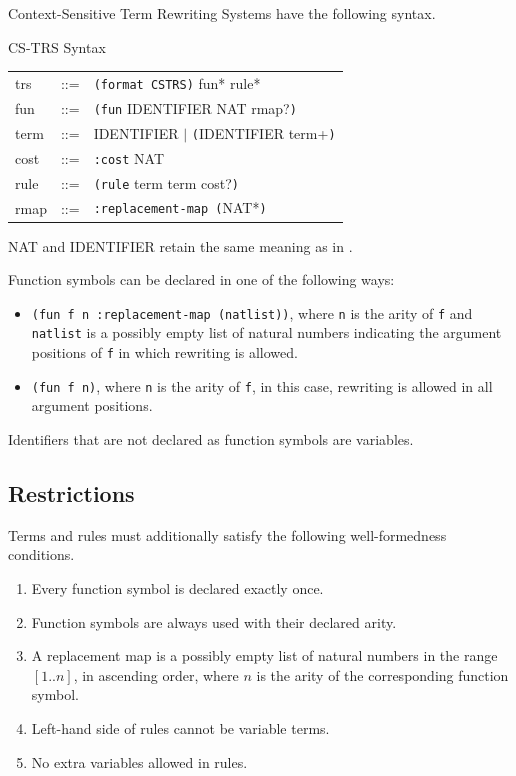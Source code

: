 Context-Sensitive Term Rewriting Systems have the following syntax.

\begin{grammar}{CS-TRS Syntax}
  \begin{tabular}{lll}
  trs & ::= & \texttt{(format CSTRS)} fun* rule* \\
  fun & ::= & \texttt{(fun} IDENTIFIER NAT rmap?\texttt{)}\\
  term & ::= & IDENTIFIER $|$ \texttt{(}IDENTIFIER term+\texttt{)} \\
  cost & ::= & \texttt{:cost} NAT \\
  rule & ::= & \texttt{(rule} term term cost?\texttt{)} \\
  rmap & ::= & \texttt{:replacement-map (}NAT*\texttt{)}
  \end{tabular}
\end{grammar}

NAT and IDENTIFIER retain the same meaning as in .

Function symbols can be declared in one of the following ways:

\begin{itemize}
  \item \texttt{(fun f n :replacement-map (natlist))}, where \texttt{n} is the arity of \texttt{f} and \texttt{natlist} is a possibly empty list of natural numbers indicating the argument positions of \texttt{f} in which rewriting is allowed.
  \item \texttt{(fun f n)}, where \texttt{n} is the arity of \texttt{f}, in this case, rewriting is allowed in all argument positions.
\end{itemize}

Identifiers that are not declared as function symbols are variables.

\subsection{Restrictions}

Terms and rules must additionally satisfy the following well-formedness conditions.
\begin{enumerate}
    \item Every function symbol is declared exactly once.
    \item Function symbols are always used with their declared arity.
    \item A replacement map is a possibly empty list of natural numbers in the range $[1..n]$, in ascending order, where $n$ is the arity of the corresponding function symbol.
    \item Left-hand side of rules cannot be variable terms.
    \item No extra variables allowed in rules.
\end{enumerate}

